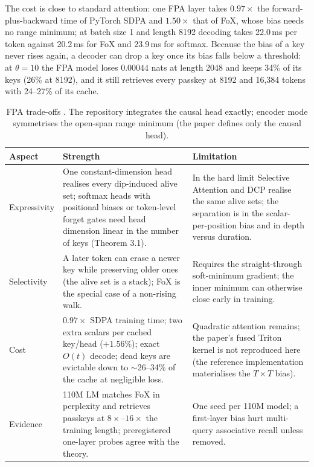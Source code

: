 The cost is close to standard attention: one FPA layer takes $0.97\times$ the forward-plus-backward time of PyTorch SDPA and $1.50\times$ that of FoX, whose bias needs no range minimum; at batch size 1 and length 8192 decoding takes 22.0\,ms per token against 20.2\,ms for FoX and 23.9\,ms for softmax. Because the bias of a key never rises again, a decoder can drop a key once its bias falls below a threshold: at $\theta=10$ the FPA model loses $0.00044$ nats at length 2048 and keeps 34\% of its keys (26\% at 8192), and it still retrieves every passkey at 8192 and 16{,}384 tokens with 24--27\% of its cache.

\begin{table}[H]
\centering
\footnotesize
\begin{tabularx}{\linewidth}{lXX}
\toprule
\textbf{Aspect} & \textbf{Strength} & \textbf{Limitation} \\
\midrule
Expressivity & One constant-dimension head realises every dip-induced alive set; softmax heads with positional biases or token-level forget gates need head dimension linear in the number of keys (Theorem 3.1). & In the hard limit Selective Attention and DCP realise the same alive sets; the separation is in the scalar-per-position bias and in depth versus duration. \\
Selectivity & A later token can erase a newer key while preserving older ones (the alive set is a stack); FoX is the special case of a non-rising walk. & Requires the straight-through soft-minimum gradient; the inner minimum can otherwise close early in training. \\
Cost & $0.97\times$ SDPA training time; two extra scalars per cached key/head ($+1.56\%$); exact $O(t)$ decode; dead keys are evictable down to $\sim$26--34\% of the cache at negligible loss. & Quadratic attention remains; the paper's fused Triton kernel is not reproduced here (the reference implementation materialises the $T\times T$ bias). \\
Evidence & 110M LM matches FoX in perplexity and retrieves passkeys at $8\times$--$16\times$ the training length; preregistered one-layer probes agree with the theory. & One seed per 110M model; a first-layer bias hurt multi-query associative recall unless removed. \\
\bottomrule
\end{tabularx}
\caption{FPA trade-offs \citep{liu_first_passage_2026}. The repository integrates the causal head exactly; encoder mode symmetrises the open-span range minimum (the paper defines only the causal head).}
\label{tab:fpa-tradeoffs}
\end{table}

